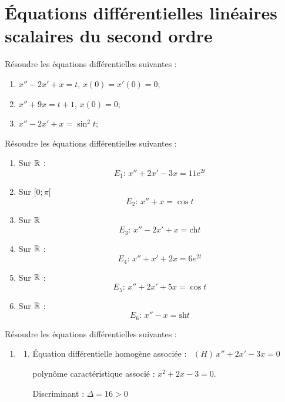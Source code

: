 \documentclass{book}
\begin{document}
\section*{Équations différentielles linéaires scalaires du second ordre}
\begin{Exercice}
Résoudre les équations différentielles suivantes :
\begin{enumerate}
\item $x''-2x'+x=t$, $x(0)=x'(0)=0$;
\item $x''+9x=t+1$, $x(0)=0$;
\item $x''-2x'+x=\sin^2 t$;
\end{enumerate}
\end{Exercice}
\begin{Exercice}
Résoudre les équations différentielles suivantes  :   
\begin{enumerate}
\item Sur $\mathbb{R}$ :
$$E_1 : \, x''+2x'-3x = 11   \mathrm{e}^{2t}      $$ %

\item Sur $[0 ; \pi[$
 $$E_2 : \, x''+x=  \cos t                  $$  %

\item Sur $\mathbb{R}$
$$E_3 : \, x''-2x'+x = \mathrm{ch} t$$

\item Sur $\mathbb{R}$ :
$$E_4 : \, x'' + x'+2x = 6 e^{2t}    $$ 

\item Sur $\mathbb{R}$ :
$$E_5 : \, x'' +  2x'+5x = \cos t    $$

\item Sur $\mathbb{R}$ :
$$E_6 : \, x'' - x = \mathrm{sh} t    $$ 
\end{enumerate} 
\begin{Correction}
Résoudre les équations différentielles suivantes  :   
\begin{enumerate}
\item %
	\begin{enumerate}
		\item  \'Equation différentielle homogène associée :  \, $ (H) \,x'' + 2x' - 3x = 0 $

			polynôme caractéristique associé : $x^2  + 2x - 3 = 0$.
			
			Discriminant : $\Delta = 16 > 0$


\end{enumerate}
\end{enumerate}
\end{Correction}
\end{Exercice}
\end{document}
